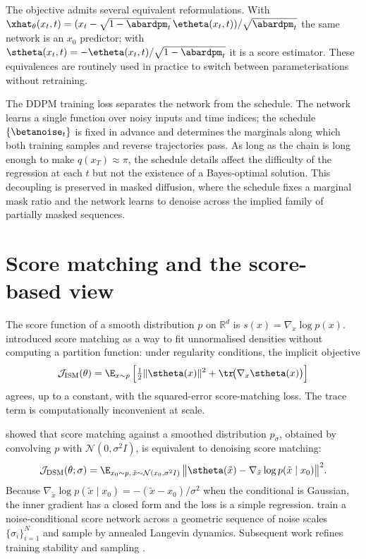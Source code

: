 The objective admits several equivalent reformulations. With
$\xhat_\theta(x_t,t)
 = (x_t - \sqrt{1-\abardpm_t}\,\etheta(x_t,t))/\sqrt{\abardpm_t}$ the same
network is an $x_0$ predictor; with $\stheta(x_t,t) =
-\etheta(x_t,t)/\sqrt{1-\abardpm_t}$ it is a score estimator. These
equivalences are routinely used in practice to switch between
parameterisations without retraining.

The DDPM training loss separates the network from the schedule. The
network learns a single function over noisy inputs and time indices; the
schedule $\{\betanoise_t\}$ is fixed in advance and determines the marginals
along which both training samples and reverse trajectories pass. As long as
the chain is long enough to make $q(x_T)\approx\pi$, the schedule details
affect the difficulty of the regression at each $t$ but not the existence of
a Bayes-optimal solution. This decoupling is preserved in masked
diffusion, where the schedule fixes a marginal mask ratio and the network
learns to denoise across the implied family of partially masked sequences.

\section{Score matching and the score-based view}
\label{lit:sec:score-matching}

The score function of a smooth distribution $p$ on $\mathbb{R}^d$ is
$s(x) = \nabla_x\log p(x)$. \textcite{hyvarinen2005estimation} introduced
score matching as a way to fit unnormalised densities without computing a
partition function: under regularity conditions, the implicit objective
\[
  \mathcal{J}_{\mathrm{ISM}}(\theta)
  = \E_{x\sim p}\,\Big[
      \tfrac{1}{2}\|\stheta(x)\|^2
      + \tr\!\big(\nabla_x \stheta(x)\big)
    \Big]
\]
agrees, up to a constant, with the squared-error score-matching loss. The
trace term is computationally inconvenient at scale.

\textcite{vincent2011connection} showed that score matching against a
smoothed distribution $p_\sigma$, obtained by convolving $p$ with
$\mathcal{N}(0,\sigma^2 I)$, is equivalent to denoising score matching:
\[
  \mathcal{J}_{\mathrm{DSM}}(\theta;\sigma)
  = \E_{x_0\sim p,\,\tilde x\sim\mathcal{N}(x_0,\sigma^2 I)}\,
    \big\|\stheta(\tilde x) - \nabla_{\tilde x}\log p(\tilde x\mid x_0)\big\|^2.
\]
Because $\nabla_{\tilde x}\log p(\tilde x\mid x_0) = -(\tilde x-x_0)/\sigma^2$
when the conditional is Gaussian, the inner gradient has a closed form and
the loss is a simple regression. \textcite{song2019ncsn} train a
noise-conditional score network across a geometric sequence of noise scales
$\{\sigma_i\}_{i=1}^{N}$ and sample by annealed Langevin dynamics. Subsequent
work refines training stability and sampling \parencite{song2020improvedncsn}.

